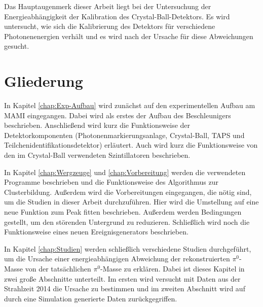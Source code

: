 \documentclass[a4paper,11pt,oneside,final,german,openbib,pdftex]{scrbook}
\begin{document}
{Das Hauptaugenmerk dieser Arbeit liegt bei der Untersuchung der Energieabh\"angigkeit der Kalibration des Crystal-Ball-Detektors. Es wird untersucht, wie sich die Kalibrierung des Detektors f\"ur verschiedene Photonenenergien verh\"alt und es wird nach der Ursache f\"ur diese Abweichungen gesucht. 
\newline	 
	
	
\section{Gliederung}

In Kapitel \ref{chap:Exp-Aufbau} wird zunächst auf den experimentellen Aufbau am MAMI eingegangen. Dabei wird als erstes der Aufbau des Beschleunigers beschrieben. Anschließend wird kurz die Funktionsweise der Detektorkomponenten (Photonenmarkierungsanlage, Crystal-Ball, TAPS und Teilchenidentifikationsdetektor) erl\"autert. Auch wird kurz die Funktionsweise von den im Crystal-Ball verwendeten Szintillatoren beschrieben.

In Kapitel \ref{chap:Wergzeuge} und \ref{chap:Vorbereitung} werden die verwendeten Programme beschrieben und die Funktionsweise des Algorithmus zur Clusterbildung. Außerdem wird die Vorbereitungen eingegangen, die nötig sind, um die Studien in dieser Arbeit durchzuführen. Hier wird die Umstellung auf eine neue Funktion zum Peak fitten beschrieben. Außerdem werden Bedingungen gestellt, um den störenden Untergrund zu reduzieren. Schließlich wird noch die Funktionsweise eines neuen Ereignisgenerators beschrieben.

In Kapitel \ref{chap:Studien} werden schließlich verschiedene Studien durchgeführt, um die Ursache einer energieabhängigen Abweichung der rekonstruierten $\pi^0$-Masse von der tatsächlichen $\pi^0$-Masse zu erklären. Dabei ist dieses Kapitel in zwei große Abschnitte unterteilt. Im ersten wird versucht mit Daten aus der Strahlzeit 2014 die Ursache zu bestimmen und im zweiten Abschnitt wird auf durch eine Simulation generierte Daten zur\"uckgegriffen.

}
\end{document}

